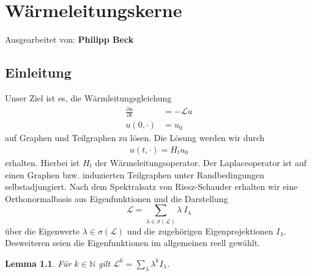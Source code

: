 \documentclass[headsepline,11pt]{scrbook}
\newtheorem{lem}{Lemma}[section]
\theoremstyle{definition}
\begin{document}
%
%
\setcounter{chapter}{7}
\chapter{W\"armeleitungskerne }

Ausgearbeitet von: {\sffamily\bfseries Philipp Beck}\\


\section{Einleitung}
Unser Ziel ist es, die W\"armleitungsgleichung 
\begin{equation}\label{eq:heat_equation}
\begin{split}
\frac{\partial u}{\partial  \mathrm{t}} &= - \mathcal{L} u\\
u(0,\cdot) &= u_0
\end{split}
\end{equation}
auf Graphen und Teilgraphen zu l\"osen.
Die L\"osung werden wir durch
\begin{align}
u(t, \cdot) = H_t u_0
\end{align}
erhalten. Hierbei ist $ H_t $ der W\"armeleitungsoperator.
Der Laplaceoperator ist auf einen Graphen bzw. induzierten Teilgraphen unter Randbedingungen selbstadjungiert.
Nach dem Spektralsatz von Riesz-Schauder erhalten wir eine Orthonormalbasis aus Eigenfunktionen und die Darstellung
\begin{equation}\label{eq:representation_laplace}
\mathcal{L}
= 
\sum \limits_{\lambda \in \sigma(\mathcal{L})}
\lambda  \ I_\lambda
\end{equation}
\"uber die Eigenwerte $ \lambda \in \sigma(\mathcal{L}) $ und die zugeh\"origen Eigenprojektionen $ I_\lambda $.
Desweiteren seien die Eigenfunktionen im allgemeinen  
reell gew\"ahlt.

\begin{lem}\label{th:representation_laplace}
	F\"ur $ k \in \mathbb{N} $ gilt
	$ \mathcal{L}^k = \sum_\lambda  \lambda^k  I_\lambda $.
\end{lem}
\end{document}

